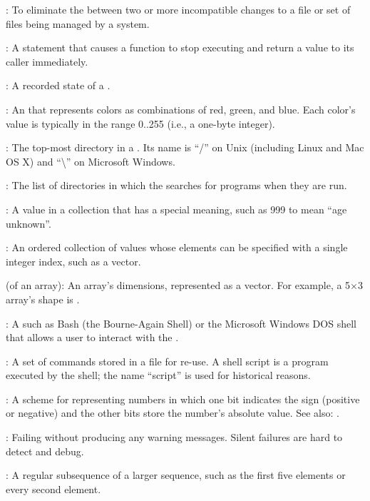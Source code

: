:
To eliminate the 
between two or more incompatible changes to a file or set of files being
managed by a  system.

:
A statement that causes a function to stop
executing and return a value to its caller immediately.

:
A recorded state of a
.

:
An  that represents colors
as combinations of red, green, and blue. Each color's value is typically
in the range 0..255 (i.e., a one-byte integer).

:
The top-most directory in a
. Its name is ``/'' on Unix
(including Linux and Mac OS X) and ``\textbackslash{}'' on Microsoft
Windows.
 
:
The list of directories in which the  searches for programs when they are run.

:
A value in a collection that has a special
meaning, such as 999 to mean ``age unknown''.

:
An ordered collection of values whose elements can be
specified with a single integer index, such as a vector.

 (of an array):
An array's dimensions, represented as a
vector. For example, a 5${\times}$3 array's shape is .

:
A  such as Bash
(the Bourne-Again Shell) or the Microsoft Windows DOS shell that allows
a user to interact with the .

:
A set of  commands
stored in a file for re-use. A shell script is a program executed by the
shell; the name ``script'' is used for historical reasons.
 
:
A scheme for representing numbers in which one bit indicates the sign (positive or negative)
and the other bits store the number's absolute value.
See also: .

:
Failing without producing any warning messages.
Silent failures are hard to detect and debug.

:
A regular subsequence of a larger sequence, such as the
first five elements or every second element.

